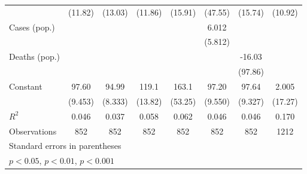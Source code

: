 \documentclass{article}
\begin{document}
{\begin{longtable}{l*{7}{c}}
                &  (11.82)         &  (13.03)         &  (11.86)         &  (15.91)         &  (47.55)         &  (15.74)         &  (10.92)         \\
Cases (pop.)    &                  &                  &                  &                  &    6.012         &                  &                  \\
                &                  &                  &                  &                  &  (5.812)         &                  &                  \\
Deaths (pop.)   &                  &                  &                  &                  &                  &   -16.03         &                  \\
                &                  &                  &                  &                  &                  &  (97.86)         &                  \\
Constant        &    97.60\sym{***}&    94.99\sym{***}&    119.1\sym{***}&    163.1\sym{*}  &    97.20\sym{***}&    97.64\sym{***}&    2.005         \\
                &  (9.453)         &  (8.333)         &  (13.82)         &  (53.25)         &  (9.550)         &  (9.327)         &  (17.27)         \\
\hline
\(R^{2}\)       &    0.046         &    0.037         &    0.058         &    0.062         &    0.046         &    0.046         &    0.170         \\
Observations    &      852         &      852         &      852         &      852         &      852         &      852         &     1212         \\
\hline\hline
\multicolumn{8}{l}{\footnotesize Standard errors in parentheses}\\
\multicolumn{8}{l}{\footnotesize \sym{*} \(p<0.05\), \sym{**} \(p<0.01\), \sym{***} \(p<0.001\)}\\
\end{longtable}
}
\end{document}
